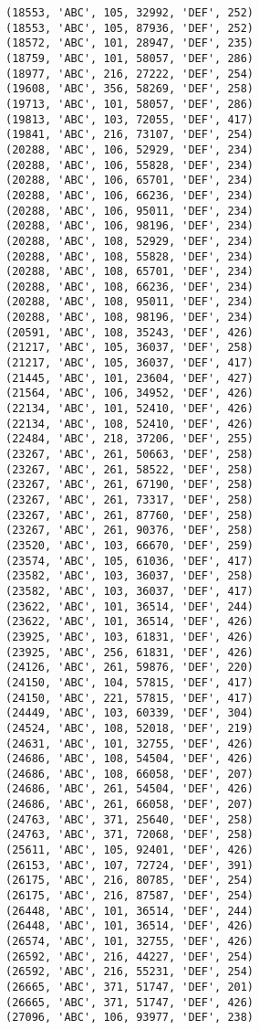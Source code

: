 \begin{verbatim}
(18553, 'ABC', 105, 32992, 'DEF', 252)
(18553, 'ABC', 105, 87936, 'DEF', 252)
(18572, 'ABC', 101, 28947, 'DEF', 235)
(18759, 'ABC', 101, 58057, 'DEF', 286)
(18977, 'ABC', 216, 27222, 'DEF', 254)
(19608, 'ABC', 356, 58269, 'DEF', 258)
(19713, 'ABC', 101, 58057, 'DEF', 286)
(19813, 'ABC', 103, 72055, 'DEF', 417)
(19841, 'ABC', 216, 73107, 'DEF', 254)
(20288, 'ABC', 106, 52929, 'DEF', 234)
(20288, 'ABC', 106, 55828, 'DEF', 234)
(20288, 'ABC', 106, 65701, 'DEF', 234)
(20288, 'ABC', 106, 66236, 'DEF', 234)
(20288, 'ABC', 106, 95011, 'DEF', 234)
(20288, 'ABC', 106, 98196, 'DEF', 234)
(20288, 'ABC', 108, 52929, 'DEF', 234)
(20288, 'ABC', 108, 55828, 'DEF', 234)
(20288, 'ABC', 108, 65701, 'DEF', 234)
(20288, 'ABC', 108, 66236, 'DEF', 234)
(20288, 'ABC', 108, 95011, 'DEF', 234)
(20288, 'ABC', 108, 98196, 'DEF', 234)
(20591, 'ABC', 108, 35243, 'DEF', 426)
(21217, 'ABC', 105, 36037, 'DEF', 258)
(21217, 'ABC', 105, 36037, 'DEF', 417)
(21445, 'ABC', 101, 23604, 'DEF', 427)
(21564, 'ABC', 106, 34952, 'DEF', 426)
(22134, 'ABC', 101, 52410, 'DEF', 426)
(22134, 'ABC', 108, 52410, 'DEF', 426)
(22484, 'ABC', 218, 37206, 'DEF', 255)
(23267, 'ABC', 261, 50663, 'DEF', 258)
(23267, 'ABC', 261, 58522, 'DEF', 258)
(23267, 'ABC', 261, 67190, 'DEF', 258)
(23267, 'ABC', 261, 73317, 'DEF', 258)
(23267, 'ABC', 261, 87760, 'DEF', 258)
(23267, 'ABC', 261, 90376, 'DEF', 258)
(23520, 'ABC', 103, 66670, 'DEF', 259)
(23574, 'ABC', 105, 61036, 'DEF', 417)
(23582, 'ABC', 103, 36037, 'DEF', 258)
(23582, 'ABC', 103, 36037, 'DEF', 417)
(23622, 'ABC', 101, 36514, 'DEF', 244)
(23622, 'ABC', 101, 36514, 'DEF', 426)
(23925, 'ABC', 103, 61831, 'DEF', 426)
(23925, 'ABC', 256, 61831, 'DEF', 426)
(24126, 'ABC', 261, 59876, 'DEF', 220)
(24150, 'ABC', 104, 57815, 'DEF', 417)
(24150, 'ABC', 221, 57815, 'DEF', 417)
(24449, 'ABC', 103, 60339, 'DEF', 304)
(24524, 'ABC', 108, 52018, 'DEF', 219)
(24631, 'ABC', 101, 32755, 'DEF', 426)
(24686, 'ABC', 108, 54504, 'DEF', 426)
(24686, 'ABC', 108, 66058, 'DEF', 207)
(24686, 'ABC', 261, 54504, 'DEF', 426)
(24686, 'ABC', 261, 66058, 'DEF', 207)
(24763, 'ABC', 371, 25640, 'DEF', 258)
(24763, 'ABC', 371, 72068, 'DEF', 258)
(25611, 'ABC', 105, 92401, 'DEF', 426)
(26153, 'ABC', 107, 72724, 'DEF', 391)
(26175, 'ABC', 216, 80785, 'DEF', 254)
(26175, 'ABC', 216, 87587, 'DEF', 254)
(26448, 'ABC', 101, 36514, 'DEF', 244)
(26448, 'ABC', 101, 36514, 'DEF', 426)
(26574, 'ABC', 101, 32755, 'DEF', 426)
(26592, 'ABC', 216, 44227, 'DEF', 254)
(26592, 'ABC', 216, 55231, 'DEF', 254)
(26665, 'ABC', 371, 51747, 'DEF', 201)
(26665, 'ABC', 371, 51747, 'DEF', 426)
(27096, 'ABC', 106, 93977, 'DEF', 238)

\end{verbatim}
